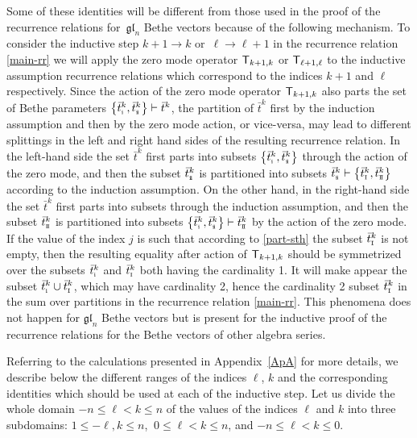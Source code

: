 \documentclass[10pt,a4paper]{amsart}
\newcommand{\so}{\scriptscriptstyle \rm I}
\newcommand{\st}{\scriptscriptstyle \rm I\hspace{-1pt}I}
\newcommand{\sso}{\scriptscriptstyle \rm i}
\newcommand{\sst}{\scriptscriptstyle \rm i\hspace{-1pt}i}
\newcommand{\bt}{{\bar t}}
\theoremstyle{definition}
\def\r#1{\eqref{#1}}
\def\sT{{\sf T}}
\begin{document}
Some of these identities will be different from those used in the proof of
the recurrence relations for~$\mathfrak{gl}_n$ Bethe vectors because of the following
mechanism. To consider the inductive step $k+1\to k$ or~${\ell\to \ell+1}$
in the recurrence relation \r{main-rr} we will apply the zero mode operator
$\sT_{k+1,k}$ or $\sT_{\ell+1,\ell}$ to the inductive assumption
recurrence relations which correspond to the indices $k+1$
and $\ell$ respectively. Since the action of the zero mode operator
$\sT_{k+1,k}$ also parts the set of Bethe parameters
$\bigl\{\bt^k_{\sso},\bt^k_{\sst}\bigr\}\vdash\bt^k$, the partition of $\bt^k$ first by the induction assumption and then by the zero mode action, or vice-versa,
 may lead to different splittings in the left and right hand sides of the resulting recurrence
relation. In the left-hand side the set $\bt^k$ first parts into subsets
$\bigl\{\bt^k_{\sso},\bt^k_{\sst}\bigr\} $ through the action of the zero mode, and then the subset $\bt^k_{\sst}$ is partitioned
into subsets $\bt^k_{\sst}\vdash\bigl\{\bt^k_{\so},\bt^k_{\st}\bigr\}$ according to
the induction assumption. On the other hand, in the right-hand side the set
$\bt^k$ first parts into subsets
\smash{$\bigl\{\bt^k_{\so},\bt^k_{\st}\bigr\} $} through the induction assumption, and then the subset $\bt^k_{\st}$ is partitioned
into subsets $\bigl\{\bt^k_{\sso},\bt^k_{\sst}\bigr\}\vdash\bt^k_{\st}$
by the action of the zero mode.
If the value of the index $j$ is such that according to \r{part-sth}
the subset $\bt^k_{\so}$ is not empty, then the resulting equality after
action of $\sT_{k+1,k}$ should be symmetrized over the subsets
$\bt^k_{\sso}$ and $\bt^k_{\so}$ both having the cardinality 1.
It will make appear the subset $\bt^k_{\sso}\cup\bt^k_{\so}$, which may have cardinality 2, hence
 the cardinality 2 subset
$\bt^k_{\so}$ in the sum over partitions in the recurrence relation \r{main-rr}.
This phenomena does not happen for $\mathfrak{gl}_n$ Bethe vectors
but is present for the inductive proof of the recurrence relations
for the Bethe vectors of other algebra series.


Referring to the calculations presented in Appendix~\ref{ApA} for more details,
we describe below the different ranges of the indices $\ell$, $k$ and the
corresponding identities which should be used at each of the inductive step.
Let us divide the whole domain $-n\leq \ell< k\leq n$
of the values of the indices $\ell$ and $k$
 into three subdomains:
$1\leq-\ell,k\leq n$, $\ 0\leq \ell< k\leq n$, and
$-n\leq \ell< k\leq 0$.
\end{document}
